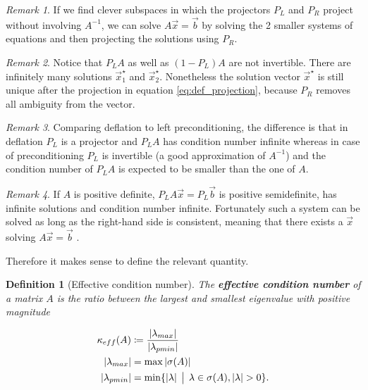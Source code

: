 \documentclass{article}
\theoremstyle{plain} %
\newtheorem{definition}{Definition}[section]
\theoremstyle{convention} %
\theoremstyle{remark} %
\newtheorem*{remark}{Remark} %
\def\df#1{\textbf{\textit{#1}}}
\numberwithin{equation}{section}
\begin{document}
\begin{remark}
If we find clever subspaces in which the projectors $P_L$ and $P_R$ project without involving $A^{-1}$, we can solve $A\vec{x} = \vec{b}$ by solving the \num{2} smaller systems of equations and then projecting the solutions using $P_R$.
\end{remark}

\begin{remark}
Notice that $P_L A$ as well as $(1-P_L)A$ are not invertible. There are infinitely many solutions $\vec{x}^{\star}_1$ and $\vec{x}^{\star}_2$\footnotemark. Nonetheless the solution vector $\vec{x}^{\star}$ is still unique after the projection in equation \eqref{eq:def_projection}, because $P_R$ removes all ambiguity from the vector.
\end{remark}


\begin{remark}
Comparing deflation to left preconditioning, the difference is that in deflation $P_L$ is a projector and $P_L A$ has condition number infinite whereas in case of preconditioning $P_L $ is invertible (a good approximation of $A^{-1}$) and the condition number of $P_L A$ is expected to be smaller than the one of $A$.
\end{remark}

\begin{remark}
If $A$ is positive definite, $P_L A \vec{x} = P_L \vec{b}$ is positive semidefinite, has infinite solutions and condition number infinite. Fortunately such a system can be solved as long as the right-hand side is consistent, meaning that there exists a $\vec{x}$ solving $A \vec{x} = \vec{b}$ \cite{kaasschieter1988}.
\end{remark}

Therefore it makes sense to define the relevant quantity.

\begin{definition}[Effective condition number]

The \df{effective condition number} of a matrix $A$ is the ratio between the largest and smallest eigenvalue with positive magnitude

\begin{align*}
  \kappa_{eff}(A) &\coloneqq \frac{\abs{\lambda_{max}}}{\abs{\lambda_{pmin}}} \\
  \abs{\lambda_{max}} &= \max \abs{\sigma(A)} \\
  \abs{\lambda_{pmin}} &= \min \{ \abs{\lambda} \, \bigm\lvert \, \lambda \in \sigma(A), \abs{\lambda} > 0 \}.
\end{align*}

\end{definition}
\end{document}
